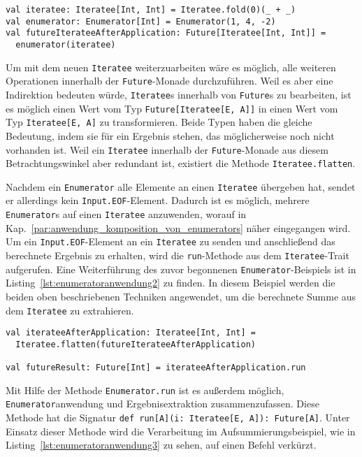 \documentclass[draft=false
              ,paper=a4
              ,twoside=false
              ,fontsize=11pt
              ,headsepline
              ,BCOR10mm
              ,DIV11
              ]{scrbook}
\begin{document}
\begin{lstlisting}[caption=Anwendung eines Enumerators auf einen Iteratee, label=lst:enumeratoranwendung1]
val iteratee: Iteratee[Int, Int] = Iteratee.fold(0)(_ + _)
val enumerator: Enumerator[Int] = Enumerator(1, 4, -2)
val futureIterateeAfterApplication: Future[Iteratee[Int, Int]] =
  enumerator(iteratee)
\end{lstlisting}


Um mit dem neuen \lstinline|Iteratee| weiterzuarbeiten wäre es möglich, alle weiteren Operationen innerhalb der \lstinline|Future|-Monade durchzuführen.
Weil es aber eine Indirektion bedeuten würde, \lstinline|Iteratee|s innerhalb von \lstinline|Future|s zu bearbeiten, ist es möglich einen Wert vom Typ \lstinline|Future[Iteratee[E, A]]| in einen Wert vom Typ \lstinline|Iteratee[E, A]| zu transformieren.
Beide Typen haben die gleiche Bedeutung, indem sie für ein Ergebnis stehen, das möglicherweise noch nicht vorhanden ist.
Weil ein \lstinline|Iteratee| innerhalb der \lstinline|Future|-Monade aus diesem Betrachtungswinkel aber redundant ist, existiert die Methode \lstinline|Iteratee.flatten|.


Nachdem ein \lstinline|Enumerator| alle Elemente an einen \lstinline|Iteratee| übergeben hat, sendet er allerdings kein \lstinline|Input.EOF|-Element.
Dadurch ist es möglich, mehrere \lstinline|Enumerator|s auf einen \lstinline|Iteratee| anzuwenden, worauf in Kap.~\ref{par:anwendung_komposition_von_enumerators} näher eingegangen wird.
Um ein \lstinline|Input.EOF|-Element an ein \lstinline|Iteratee| zu senden und anschließend das berechnete Ergebnis zu erhalten, wird die \lstinline|run|-Methode aus dem \lstinline|Iteratee|-Trait aufgerufen.
Eine Weiterführung des zuvor begonnenen \lstinline|Enumerator|-Beispiels ist in Listing~\ref{lst:enumeratoranwendung2} zu finden.
In diesem Beispiel werden die beiden oben beschriebenen Techniken angewendet, um die berechnete Summe aus dem \lstinline|Iteratee| zu extrahieren.

\begin{lstlisting}[caption=Extrahierung des Ergebnisses aus einem Iteratee, label=lst:enumeratoranwendung2]
val iterateeAfterApplication: Iteratee[Int, Int] =
  Iteratee.flatten(futureIterateeAfterApplication)

val futureResult: Future[Int] = iterateeAfterApplication.run
\end{lstlisting}

Mit Hilfe der Methode \lstinline|Enumerator.run| ist es außerdem möglich, \lstinline|Enumerator|anwendung und Ergebnisextraktion zusammenzufassen.
Diese Methode hat die Signatur \lstinline[breaklines=true]|def run[A](i: Iteratee[E, A]): Future[A]|.
Unter Einsatz dieser Methode wird die Verarbeitung im Aufsummierungsbeispiel, wie in Listing~\ref{lst:enumeratoranwendung3} zu sehen, auf einen Befehl verkürzt.
\end{document}
